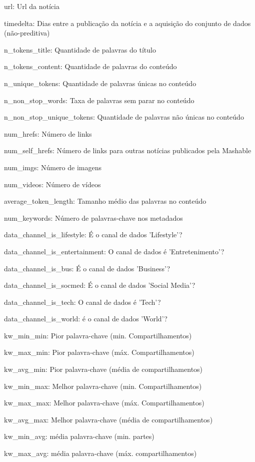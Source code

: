 \documentclass[11pt]{article}
\begin{document}
url: Url da notícia

timedelta: Dias entre a publicação da notícia e a aquisição do conjunto
de dados (não-preditiva)

n\_tokens\_title: Quantidade de palavras do título

n\_tokens\_content: Quantidade de palavras do conteúdo

n\_unique\_tokens: Quantidade de palavras únicas no conteúdo

n\_non\_stop\_words: Taxa de palavras sem parar no conteúdo

n\_non\_stop\_unique\_tokens: Quantidade de palavras não únicas no
conteúdo

num\_hrefs: Número de links

num\_self\_hrefs: Número de links para outras notícias publicados pela
Mashable

num\_imgs: Número de imagens

num\_videos: Número de vídeos

average\_token\_length: Tamanho médio das palavras no conteúdo

num\_keywords: Número de palavras-chave nos metadados

data\_channel\_is\_lifestyle: É o canal de dados 'Lifestyle'?

data\_channel\_is\_entertainment: O canal de dados é 'Entretenimento'?

data\_channel\_is\_bus: É o canal de dados 'Business'?

data\_channel\_is\_socmed: É o canal de dados 'Social Media'?

data\_channel\_is\_tech: O canal de dados é 'Tech'?

data\_channel\_is\_world: é o canal de dados 'World'?

kw\_min\_min: Pior palavra-chave (min. Compartilhamentos)

kw\_max\_min: Pior palavra-chave (máx. Compartilhamentos)

kw\_avg\_min: Pior palavra-chave (média de compartilhamentos)

kw\_min\_max: Melhor palavra-chave (min. Compartilhamentos)

kw\_max\_max: Melhor palavra-chave (máx. Compartilhamentos)

kw\_avg\_max: Melhor palavra-chave (média de compartilhamentos)

kw\_min\_avg: média palavra-chave (min. partes)

kw\_max\_avg: média palavra-chave (máx. compartilhamentos)
\end{document}
